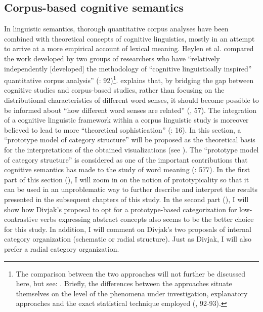 \subsection{\label{sec:2.4.3}  Corpus-based cognitive semantics}

In linguistic semantics, thorough quantitative corpus analyses have been combined with theoretical concepts of cognitive linguistics, mostly in an attempt to arrive at a more empirical account of lexical meaning. Heylen et al. compared the work developed by two groups of researchers who have “relatively independently [developed] the methodology of “cognitive linguistically inspired” quantitative corpus analysis” (\citealt{kristiansen_methodological_2008}: 92)\footnote{The comparison between the two approaches will not further be discussed here, but see: \citet{kristiansen_methodological_2008}. Briefly, the differences between the approaches situate themselves on the level of the phenomena under investigation, explanatory approaches and the exact statistical technique employed (\citealt{kristiansen_methodological_2008}, 92-93).}. \citet{Gries2006b} explains that, by bridging the gap between cognitive studies and corpus-based studies, rather than focusing on the distributional characteristics of different word senses, it should become possible to be informed about “how different word senses are related” (\citealt{Gries2006b}, 57). The integration of a cognitive linguistic framework within a corpus linguistic study is moreover believed to lead to more “theoretical sophistication” (\citealt{gilquin_corpus_2010}: 16). In this section, a “prototype model of category structure” will be proposed as the theoretical basis for the interpretations of the obtained visualizations (see ). The “prototype model of category structure” is considered as one of the important contributions that cognitive semantics has made to the study of word meaning (\citealt{allan_lexical_2013}: 577). In the first part of this section (), I will zoom in on the notion of prototypicality so that it can be used in an unproblematic way to further describe and interpret the results presented in the subsequent chapters of this study. In the second part (), I will show how Divjak’s proposal to opt for a prototype-based categorization for low-contrastive verbs expressing abstract concepts also seems to be the better choice for this study. In addition, I will comment on Divjak’s two proposals of internal category organization (schematic or radial structure). Just as Divjak, I will also prefer a radial category organization.


